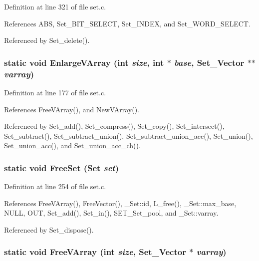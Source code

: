 Definition at line 321 of file set.c.

References ABS, Set\_\-BIT\_\-SELECT, Set\_\-INDEX, and Set\_\-WORD\_\-SELECT.

Referenced by Set\_\-delete().
\subsubsection{\setlength{\rightskip}{0pt plus 5cm}static void Enlarge\-VArray (int {\em size}, int $\ast$ {\em base}, \bf{Set\_\-Vector} $\ast$$\ast$ {\em varray})\hspace{0.3cm}{\tt  [static]}}\label{set_8c_10970ab09f7e46a8719920602e0a9e7e}




Definition at line 177 of file set.c.

References Free\-VArray(), and New\-VArray().

Referenced by Set\_\-add(), Set\_\-compress(), Set\_\-copy(), Set\_\-intersect(), Set\_\-subtract(), Set\_\-subtract\_\-union(), Set\_\-subtract\_\-union\_\-acc(), Set\_\-union(), Set\_\-union\_\-acc(), and Set\_\-union\_\-acc\_\-ch().
\subsubsection{\setlength{\rightskip}{0pt plus 5cm}static void Free\-Set (\bf{Set} {\em set})\hspace{0.3cm}{\tt  [static]}}\label{set_8c_427359f9117b6f6704b809ce8cedc4a1}




Definition at line 254 of file set.c.

References Free\-VArray(), Free\-Vector(), \_\-Set::id, L\_\-free(), \_\-Set::max\_\-base, NULL, OUT, Set\_\-add(), Set\_\-in(), SET\_\-Set\_\-pool, and \_\-Set::varray.

Referenced by Set\_\-dispose().
\subsubsection{\setlength{\rightskip}{0pt plus 5cm}static void Free\-VArray (int {\em size}, \bf{Set\_\-Vector} $\ast$ {\em varray})\hspace{0.3cm}{\tt  [static]}}\label{set_8c_d6509ff0308c8759e8dd6a1478fe9376}




